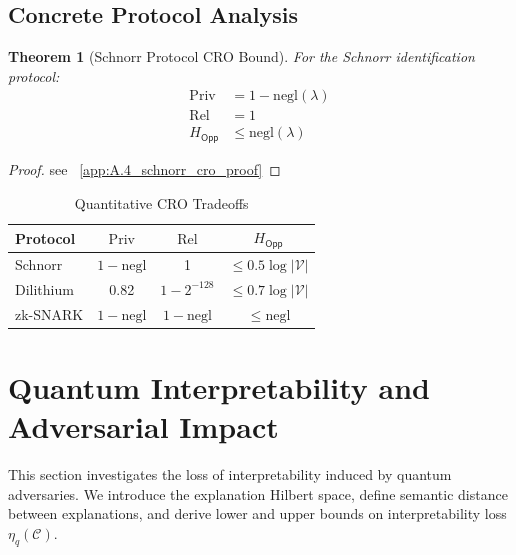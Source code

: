\documentclass[preprint,12pt]{elsarticle}
\newtheorem{theorem}{Theorem}[section]
\newcommand{\negl}{\mathrm{negl}}
\begin{document}
        \subsection{Concrete Protocol Analysis}
            \label{subsec:concrete_analysis}

            \begin{theorem}[Schnorr Protocol CRO Bound]\label{thm:schnorr_prot_cro_bound}
                For the Schnorr identification protocol:
                \begin{align*}
                    \mathrm{Priv} &= 1 - \negl(\lambda) \\
                    \mathrm{Rel} &= 1 \\
                    H_{\mathsf{Opp}} &\leq \negl(\lambda)
                \end{align*}
            \end{theorem}

            \begin{proof}\label{pr:schnorr_prot_cro_bound}
                see ~\ref{app:A.4_schnorr_cro_proof}
            \end{proof}

            \begin{table}[h]
                \centering
                \caption{Quantitative CRO Tradeoffs}
                \begin{tabular}{lccc}
                    \toprule
                    Protocol & $\mathrm{Priv}$ & $\mathrm{Rel}$ & $H_{\mathsf{Opp}}$ \\
                    \midrule
                    Schnorr & $1 - \negl$ & 1 & $\leq 0.5 \log|\mathcal{V}|$ \\
                    Dilithium & 0.82 & $1 - 2^{-128}$ & $\leq 0.7 \log|\mathcal{V}|$ \\
                    zk-SNARK & $1 - \negl$ & $1 - \negl$ & $\leq \negl$ \\
                    \bottomrule
                \end{tabular}
                \label{tab:concrete_metrics}
            \end{table}

    \section{Quantum Interpretability and Adversarial Impact}\label{sec:interpretability}

        This section investigates the loss of interpretability induced by quantum adversaries. We introduce the explanation Hilbert space, define semantic distance between explanations, and derive lower and upper bounds on interpretability loss $\eta_q(\mathcal{C})$.
\end{document}
